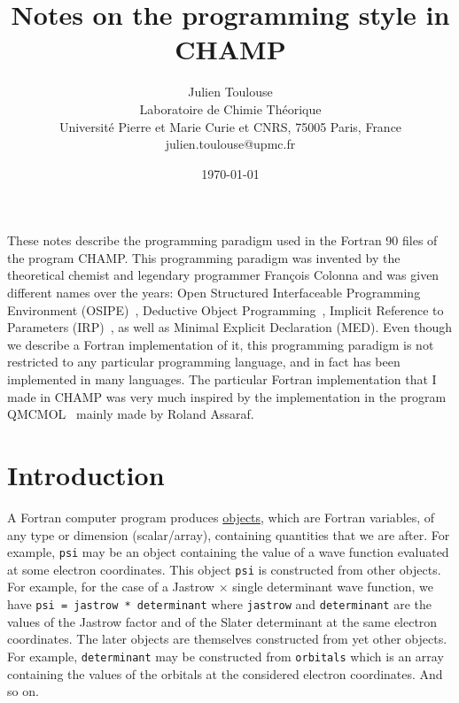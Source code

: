 \documentclass[letter,11pt]{article}
\newcommand\Def[1]{\underline{#1}}
\begin{document}
\title{Notes on the programming style in CHAMP}

\author{Julien Toulouse\\
Laboratoire de Chimie Th\'eorique\\Universit\'e Pierre et Marie Curie et CNRS, 75005 Paris, France\\
julien.toulouse@upmc.fr}

\date{\today}

\maketitle

\setcounter{secnumdepth}{5}
\setcounter{tocdepth}{5}
\vspace*{5em}

These notes describe the programming paradigm used in the Fortran 90 files of the program CHAMP. This programming paradigm was invented by the theoretical chemist and legendary programmer François Colonna and was given different names over the years:
Open Structured Interfaceable Programming Environment (OSIPE)~\cite{ColJolPoiAngJan-CPC-94},
Deductive Object Programming~\cite{Col-ARX-06},
Implicit Reference to Parameters (IRP)~\cite{Sce-ARX-09},
as well as Minimal Explicit Declaration (MED).
Even though we describe a Fortran implementation of it, this programming paradigm is not restricted to any particular programming language, and in fact has been implemented in many languages. The particular Fortran implementation that I made in CHAMP was very much inspired by the implementation in the program QMCMOL~\cite{Qmc-PROG-XX} mainly made by Roland Assaraf.

\section{Introduction}
A Fortran computer program produces \Def{objects}, which are Fortran variables, of any type or dimension (scalar/array), containing quantities that we are after. For example, {\tt psi} may be an object containing the value of a wave function evaluated at some electron coordinates. This object {\tt psi} is constructed from other objects. For example, for the case of a Jastrow $\times$ single determinant wave function, we have {\tt psi = jastrow * determinant} where {\tt jastrow} and {\tt determinant} are the values of the Jastrow factor and of the Slater determinant at the same electron coordinates. The later objects are themselves constructed from yet other objects. For example, {\tt determinant} may be constructed from {\tt orbitals} which is an array containing the values of the orbitals at the considered electron coordinates. And so on.
\end{document}
